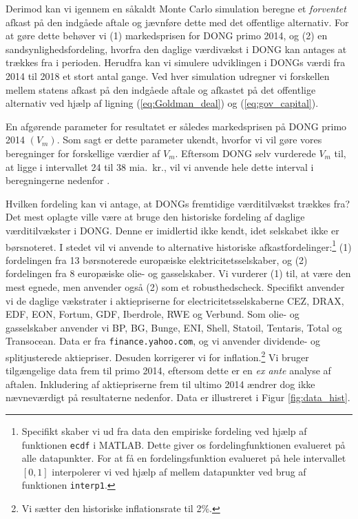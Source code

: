 \documentclass{article}
\begin{document}
Derimod kan vi igennem en såkaldt Monte Carlo simulation beregne et \emph{forventet} afkast på den indgåede aftale og jævnføre dette med det offentlige alternativ. For at gøre dette behøver vi (1) markedsprisen for DONG primo 2014, og (2) en sandsynlighedsfordeling, hvorfra den daglige værdivækst i DONG kan antages at trækkes fra i perioden. Herudfra kan vi simulere udviklingen i DONGs værdi fra 2014 til 2018 et stort antal gange. Ved hver simulation udregner vi forskellen mellem statens afkast på den indgåede aftale og afkastet på det offentlige alternativ ved hjælp af ligning (\ref{eq:Goldman_deal}) og (\ref{eq:gov_capital}).

En afgørende parameter for resultatet er således markedsprisen på DONG primo 2014 $(V_m)$. Som sagt er dette parameter ukendt, hvorfor vi vil gøre vores beregninger for forskellige værdier af $V_m$. Eftersom DONG selv vurderede $V_m$ til, at ligge i intervallet 24 til 38 mia.\ kr., vil vi anvende hele dette interval i beregningerne nedenfor \citep{DONG2015b}.

Hvilken fordeling kan vi antage, at DONGs fremtidige værditilvækst trækkes fra? Det mest oplagte ville være at bruge den historiske fordeling af daglige værditilvækster i DONG. Denne er imidlertid ikke kendt, idet selskabet ikke er børsnoteret. I stedet vil vi anvende to alternative historiske afkastfordelinger:\footnote{Specifikt skaber vi ud fra data den empiriske fordeling ved hjælp af funktionen \texttt{ecdf} i MATLAB. Dette giver os fordelingfunktionen evalueret på alle datapunkter. For at få en fordelingsfunktion evalueret på hele intervallet $[0,1]$ interpolerer vi ved hjælp af mellem datapunkter ved brug af funktionen \texttt{interp1}.} (1)  fordelingen fra 13 børsnoterede europæiske elektricitetsselskaber, og (2) fordelingen fra 8 europæiske olie- og gasselskaber. Vi vurderer (1) til, at være den mest egnede, men anvender også (2) som et robusthedscheck. Specifikt anvender vi de daglige vækstrater i aktiepriserne for electricitetsselskaberne CEZ, DRAX, EDF, EON, Fortum, GDF, Iberdrole, RWE og Verbund. Som olie- og gasselskaber anvender vi BP, BG, Bunge, ENI, Shell, Statoil, Tentaris, Total og Transocean. Data er fra \texttt{finance.yahoo.com}, og vi anvender dividende- og splitjusterede aktiepriser. Desuden korrigerer vi for inflation.\footnote{Vi sætter den historiske inflationsrate til 2\%.} Vi bruger tilgængelige data frem til primo 2014, eftersom dette er en \emph{ex ante} analyse af aftalen. Inkludering af aktiepriserne frem til ultimo 2014 ændrer dog ikke nævneværdigt på resultaterne nedenfor. Data er illustreret i Figur \ref{fig:data_hist}.
\end{document}
